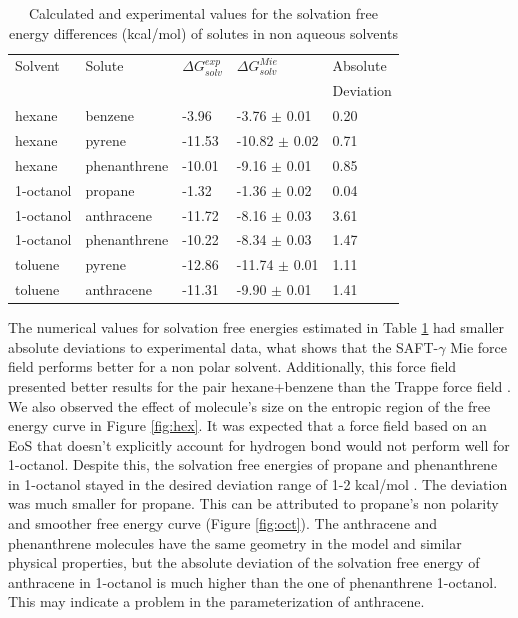 \begin{table}[h]
\centering
  \caption{Calculated and experimental values for the solvation free energy differences (kcal/mol) of solutes in non aqueous solvents}
  \label{tbl:solv1}
  \begin{tabular}{lllll}
    \hline
      Solvent & Solute & $\Delta G_{solv}^{exp}$ & $\Delta G_{solv}^{Mie}$ & Absolute \\
      & & & & Deviation \\
    \hline
    hexane    & benzene      & -3.96  & -3.76  $\pm$ 0.01 & 0.20 \\
    hexane    & pyrene       & -11.53 & -10.82 $\pm$ 0.02 & 0.71 \\
    hexane    & phenanthrene & -10.01 & -9.16  $\pm$ 0.01 & 0.85 \\
    1-octanol & propane      & -1.32  & -1.36  $\pm$ 0.02 & 0.04 \\
    1-octanol & anthracene   & -11.72 & -8.16  $\pm$ 0.03 & 3.61 \\
    1-octanol & phenanthrene & -10.22 & -8.34  $\pm$ 0.03 & 1.47 \\
    toluene   & pyrene       & -12.86 & -11.74 $\pm$ 0.01 & 1.11\\
    toluene   & anthracene   & -11.31 & -9.90 $\pm$ 0.01 & 1.41\\
    \hline
  \end{tabular}
\end{table}
\FloatBarrier

The numerical values for solvation free energies estimated in Table \ref{tbl:solv1} had smaller absolute deviations to experimental data, what shows that the SAFT-$\gamma$ Mie force field performs better for a non polar solvent. Additionally, this force field presented better results for the pair hexane+benzene than the Trappe force field \cite{garrido2011}. We also observed the effect of molecule's size on the entropic region of the free energy curve in Figure \ref{fig:hex}. It was expected that a force field based on an EoS that doesn't explicitly account for hydrogen bond would not perform well for 1-octanol. Despite this, the solvation free energies of propane and phenanthrene in 1-octanol stayed in the desired deviation range of 1-2 kcal/mol \cite{doimobley}. The deviation was much smaller for propane. This can be attributed to propane's non polarity and smoother free energy curve (Figure \ref{fig:oct}). The anthracene and phenanthrene molecules have the same geometry in the model and similar physical properties, but the absolute deviation of the solvation free energy of anthracene in 1-octanol is much higher than the one of phenanthrene 1-octanol. This may indicate a problem in the parameterization of anthracene.     

